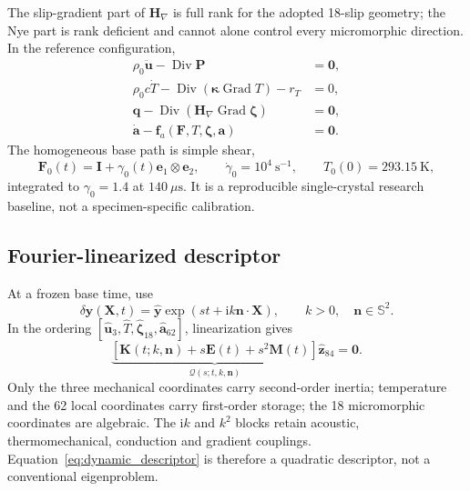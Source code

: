 The slip-gradient part of $\boldsymbol H_\nabla$ is full rank for the adopted
18-slip geometry; the Nye part is rank deficient and cannot alone control
every micromorphic direction. In the reference configuration,
\begin{align}
 \rho_0\ddot{\boldsymbol u}-\operatorname{Div}\boldsymbol P&=\boldsymbol0,
 \label{eq:dyn_balance_momentum}\\
 \rho_0c\dot T-\operatorname{Div}(\boldsymbol\kappa\operatorname{Grad}T)-r_T&=0,
 \label{eq:dyn_balance_heat}\\
 \boldsymbol q-\operatorname{Div}
 (\boldsymbol H_\nabla\operatorname{Grad}\boldsymbol\zeta)&=\boldsymbol0,
 \label{eq:dyn_balance_microforce}\\
 \dot{\boldsymbol a}-\boldsymbol f_a(\boldsymbol F,T,\boldsymbol\zeta,\boldsymbol a)&=\boldsymbol0.
 \label{eq:dyn_balance_state}
\end{align}
The homogeneous base path is simple shear,
\begin{equation}
 \boldsymbol F_0(t)=\boldsymbol I+\gamma_0(t)
 \boldsymbol e_1\otimes\boldsymbol e_2,
 \qquad \dot\gamma_0=10^4~\mathrm{s}^{-1},
 \qquad T_0(0)=293.15~\mathrm K,
 \label{eq:dyn_base_shear}
\end{equation}
integrated to $\gamma_0=1.4$ at $140~\mu\mathrm s$. It is a reproducible single-crystal research baseline, not a specimen-specific calibration.

\subsection{Fourier-linearized descriptor}

At a frozen base time, use
\begin{equation}
 \delta\boldsymbol y(\boldsymbol X,t)=\widehat{\boldsymbol y}
 \exp\!\left(s t+\mathrm ik\boldsymbol n\cdot\boldsymbol X\right),
 \qquad k>0,\quad\boldsymbol n\in\mathbb S^2 .
 \label{eq:dyn_fourier_ansatz}
\end{equation}
In the ordering $[\widehat{\boldsymbol u}_3,\widehat T,
\widehat{\boldsymbol\zeta}_{18},\widehat{\boldsymbol a}_{62}]$, linearization gives
\begin{equation}
 \underbrace{[\boldsymbol K(t;k,\boldsymbol n)+s\boldsymbol E(t)
 +s^2\boldsymbol M(t)]}_{\boldsymbol{\mathcal Q}(s;t,k,\boldsymbol n)}
 \widehat{\boldsymbol z}_{84}=\boldsymbol0.
 \label{eq:dynamic_descriptor}
\end{equation}
Only the three mechanical coordinates carry second-order inertia; temperature and the 62 local coordinates carry first-order storage; the 18 micromorphic coordinates are algebraic. The $\mathrm ik$ and $k^2$ blocks retain acoustic, thermomechanical, conduction and gradient couplings. Equation~\eqref{eq:dynamic_descriptor} is therefore a quadratic descriptor, not a conventional eigenproblem.
